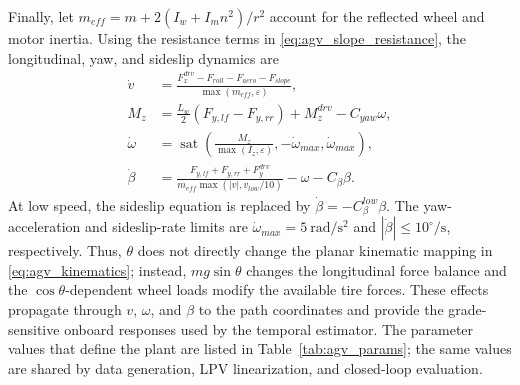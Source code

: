 \documentclass{ieeeaccess}
\begin{document}
Finally, let $m_{eff}=m+2(I_w+I_mn^2)/r^2$ account for the reflected wheel and motor inertia. Using the resistance terms in \eqref{eq:agv_slope_resistance}, the longitudinal, yaw, and sideslip dynamics are
\begin{equation}
\begin{aligned}
\dot v&=\frac{F_x^{drv}-F_{roll}-F_{aero}-F_{slope}}
{\max(m_{eff},\varepsilon)},\\
M_z&=\frac{L_w}{2}(F_{y,lf}-F_{y,rr})+M_z^{drv}-C_{yaw}\omega,\\
\dot\omega&=\operatorname{sat}\!\left(
\frac{M_z}{\max(I_z,\varepsilon)},-\dot\omega_{max},\dot\omega_{max}\right),\\
\dot\beta&=\frac{F_{y,lf}+F_{y,rr}+F_y^{drv}}
{m_{eff}\max(|v|,v_{low}/10)}-\omega-C_{\beta}\beta.
\end{aligned}
\label{eq:agv_continuous_dynamics}
\end{equation}
At low speed, the sideslip equation is replaced by $\dot\beta=-C_{\beta}^{low}\beta$. The yaw-acceleration and sideslip-rate limits are $\dot\omega_{max}=5~\mathrm{rad/s^2}$ and $|\dot\beta|\leq10^{\circ}/\mathrm{s}$, respectively. Thus, $\theta$ does not directly change the planar kinematic mapping in \eqref{eq:agv_kinematics}; instead, $mg\sin\theta$ changes the longitudinal force balance and the $\cos\theta$-dependent wheel loads modify the available tire forces. These effects propagate through $v$, $\omega$, and $\beta$ to the path coordinates and provide the grade-sensitive onboard responses used by the temporal estimator. The parameter values that define the plant are listed in Table~\ref{tab:agv_params}; the same values are shared by data generation, LPV linearization, and closed-loop evaluation.
\end{document}
